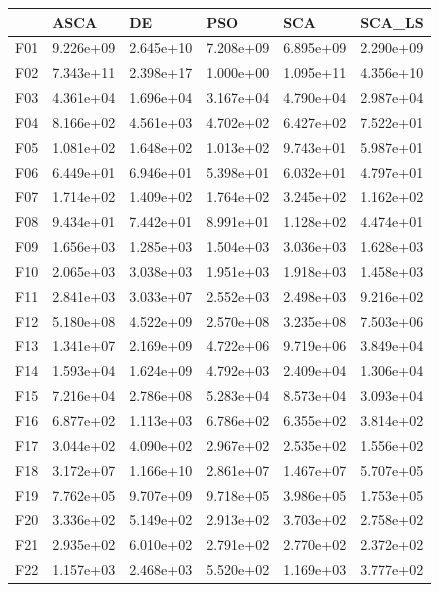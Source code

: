 \begin{tabular}{llllll}
\toprule
{} &       ASCA &         DE &        PSO &        SCA &     SCA\_LS \\
\midrule
F01  &  9.226e+09 &  2.645e+10 &  7.208e+09 &  6.895e+09 &  2.290e+09 \\
F02  &  7.343e+11 &  2.398e+17 &  1.000e+00 &  1.095e+11 &  4.356e+10 \\
F03  &  4.361e+04 &  1.696e+04 &  3.167e+04 &  4.790e+04 &  2.987e+04 \\
F04  &  8.166e+02 &  4.561e+03 &  4.702e+02 &  6.427e+02 &  7.522e+01 \\
F05  &  1.081e+02 &  1.648e+02 &  1.013e+02 &  9.743e+01 &  5.987e+01 \\
F06  &  6.449e+01 &  6.946e+01 &  5.398e+01 &  6.032e+01 &  4.797e+01 \\
F07  &  1.714e+02 &  1.409e+02 &  1.764e+02 &  3.245e+02 &  1.162e+02 \\
F08  &  9.434e+01 &  7.442e+01 &  8.991e+01 &  1.128e+02 &  4.474e+01 \\
F09  &  1.656e+03 &  1.285e+03 &  1.504e+03 &  3.036e+03 &  1.628e+03 \\
F10  &  2.065e+03 &  3.038e+03 &  1.951e+03 &  1.918e+03 &  1.458e+03 \\
F11  &  2.841e+03 &  3.033e+07 &  2.552e+03 &  2.498e+03 &  9.216e+02 \\
F12  &  5.180e+08 &  4.522e+09 &  2.570e+08 &  3.235e+08 &  7.503e+06 \\
F13  &  1.341e+07 &  2.169e+09 &  4.722e+06 &  9.719e+06 &  3.849e+04 \\
F14  &  1.593e+04 &  1.624e+09 &  4.792e+03 &  2.409e+04 &  1.306e+04 \\
F15  &  7.216e+04 &  2.786e+08 &  5.283e+04 &  8.573e+04 &  3.093e+04 \\
F16  &  6.877e+02 &  1.113e+03 &  6.786e+02 &  6.355e+02 &  3.814e+02 \\
F17  &  3.044e+02 &  4.090e+02 &  2.967e+02 &  2.535e+02 &  1.556e+02 \\
F18  &  3.172e+07 &  1.166e+10 &  2.861e+07 &  1.467e+07 &  5.707e+05 \\
F19  &  7.762e+05 &  9.707e+09 &  9.718e+05 &  3.986e+05 &  1.753e+05 \\
F20  &  3.336e+02 &  5.149e+02 &  2.913e+02 &  3.703e+02 &  2.758e+02 \\
F21  &  2.935e+02 &  6.010e+02 &  2.791e+02 &  2.770e+02 &  2.372e+02 \\
F22  &  1.157e+03 &  2.468e+03 &  5.520e+02 &  1.169e+03 &  3.777e+02 \\

\end{tabular}
